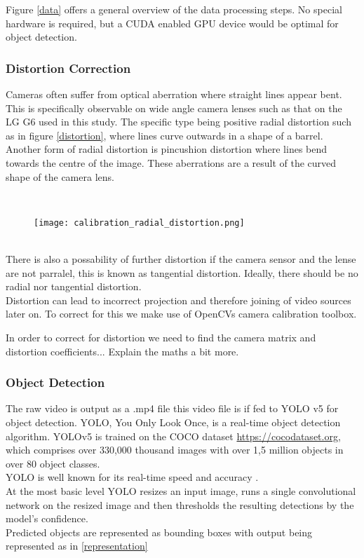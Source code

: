 Figure \ref{data} offers a general overview of the data processing steps. No special hardware is required, but a CUDA enabled GPU
device would be optimal for object detection.
\ \\
\subsubsection{Distortion Correction}

Cameras often suffer from optical aberration where straight lines appear bent. This is specifically observable on 
wide angle camera lenses such as that on the LG G6 used in this study.
The specific type being positive radial distortion such as in figure \ref{distortion}, where lines curve outwards in a shape of a barrel.
Another form of radial distortion is pincushion distortion where lines bend towards the centre of the image. These aberrations are a result 
of the curved shape of the camera lens.

\ \\ 
\begin{figure}[h]
  \texttt{[image: calibration\_radial\_distortion.png]}
  \centering 
  \end{figure}
  \label{distortion}

\ \\

There is also a possability of further distortion if the camera sensor and the lense are not parralel, this is known as tangential distortion.
Ideally, there should be no radial nor tangential distortion.
\ \\
Distortion can lead to incorrect projection and therefore joining of video sources later on.
To correct for this we make use of OpenCVs \cite{noauthor_opencv/opencv_2021} camera calibration toolbox.

In order to correct for distortion we need to find the camera matrix and distortion coefficients... Explain the maths a bit more.
\ \\
\subsubsection{Object Detection}

The raw video is output as a .mp4 file this video file is if fed to YOLO v5 for object detection. YOLO, You Only Look Once,
is a real-time object detection algorithm. YOLOv5 is trained on the COCO dataset \url{https://cocodataset.org}, which comprises over 330,000 thousand images
with over 1,5 million objects in over 80 object classes.
\ \\ 
YOLO is well known for its real-time speed and accuracy \cite{redmon2016look}.
\ \\ 
At the most basic level YOLO resizes an input image, runs a single convolutional network on the resized image
and then thresholds the resulting detections by the model’s confidence.
\ \\ 
Predicted objects are represented as bounding boxes with output being represented as in \ref{representation} 

